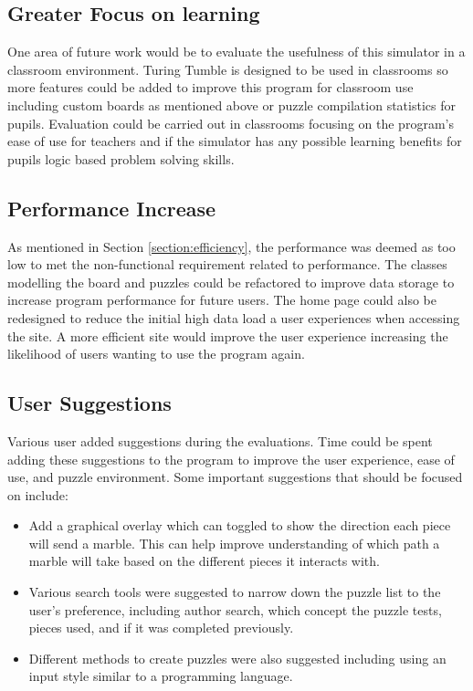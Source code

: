 \documentclass{l4proj}
\begin{document}
\subsection{Greater Focus on learning}
One area of future work would be to evaluate the usefulness of this simulator in a classroom environment. Turing Tumble is designed to be used in classrooms so more features could be added to improve this program for classroom use including custom boards as mentioned above or puzzle compilation statistics for pupils. Evaluation could be carried out in classrooms focusing on the program's ease of use for teachers and if the simulator has any possible learning benefits for pupils logic based problem solving skills. 

\subsection{Performance Increase}
As mentioned in Section \ref{section:efficiency}, the performance was deemed as too low to met the non-functional requirement related to performance. The classes modelling the board and puzzles could be refactored to improve data storage to increase program performance for future users. The home page could also be redesigned to reduce the initial high data load a user experiences when accessing the site. A more efficient site would improve the user experience increasing the likelihood of users wanting to use the program again. 

\subsection{User Suggestions}
Various user added suggestions during the evaluations. Time could be spent adding these suggestions to the program to improve the user experience, ease of use, and puzzle environment. Some important suggestions that should be focused on include: 
\begin{itemize}
    \item Add a graphical overlay which can toggled to show the direction each piece will send a marble. This can help improve understanding of which path a marble will take based on the different pieces it interacts with.
    \item Various search tools were suggested to narrow down the puzzle list to the user's preference, including author search, which concept the puzzle tests, pieces used, and if it was completed previously.
    \item Different methods to create puzzles were also suggested including using an input style similar to a programming language.
\end{itemize}
\end{document}
